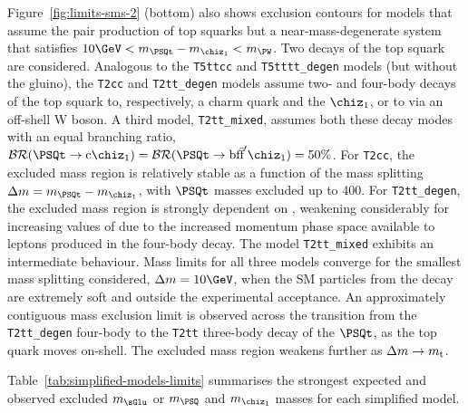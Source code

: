 Figure~\ref{fig:limits-sms-2} (bottom) also shows exclusion contours
for models that assume the pair production of top squarks but a
near-mass-degenerate system that satisfies $10\GeV < m_{\PSQt} -
m_{\chiz_1} < m_\PW$. Two decays of the top squark are
considered. Analogous to the \texttt{T5ttcc} and
\texttt{T5tttt\_degen} models (but without the gluino), the
\texttt{T2cc} and \texttt{T2tt\_degen} models assume two- and
four-body decays of the top squark to, respectively, a charm quark and
the $\chiz_1$, or to via an off-shell W boson. A third model,
\texttt{T2tt\_mixed}, assumes both these decay modes with an equal
branching ratio, $\mathcal{BR}(\PSQt \ra \text{c}\chiz_1) =
\mathcal{BR}(\PSQt \ra \text{bf}\bar{\text{f}}'\chiz_1) = 50\%$. For
\texttt{T2cc}, the excluded mass region is relatively stable as a
function of the mass splitting $\dm = m_{\PSQt} - m_{\chiz_1}$, with
$\PSQt$ masses excluded up to 400\GeV. For \texttt{T2tt\_degen}, the
excluded mass region is strongly dependent on \dm, weakening
considerably for increasing values of \dm due to the increased
momentum phase space available to leptons produced in the four-body
decay. The model \texttt{T2tt\_mixed} exhibits an intermediate
behaviour. Mass limits for all three models converge for the smallest
mass splitting considered, $\dm = 10\GeV$, when the SM particles from
the \PSQt decay are extremely soft and outside the experimental
acceptance. An approximately contiguous mass exclusion limit is
observed across the transition from the \texttt{T2tt\_degen} four-body
to the \texttt{T2tt} three-body decay of the $\PSQt$, as the top quark
moves on-shell. The excluded mass region weakens further as $\Delta m \rightarrow
m_\text{t}$.

Table~\ref{tab:simplified-models-limits} summarises the strongest
expected and observed excluded $m_{\sGlu}$ or $m_{\PSQ}$ and
$m_{\chiz_1}$ masses for each simplified model.

